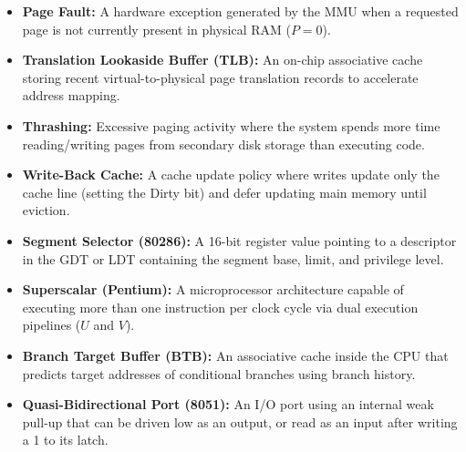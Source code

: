 \documentclass[12pt,a4paper]{article}
\begin{document}
\begin{tcolorbox}[defbox, title={One-Line Definitions}]
\begin{itemize}[leftmargin=*, itemsep=3pt]
  \item \textbf{Page Fault:} A hardware exception generated by the MMU when a requested page is not currently present in physical RAM ($P = 0$).
  \item \textbf{Translation Lookaside Buffer (TLB):} An on-chip associative cache storing recent virtual-to-physical page translation records to accelerate address mapping.
  \item \textbf{Thrashing:} Excessive paging activity where the system spends more time reading/writing pages from secondary disk storage than executing code.
  \item \textbf{Write-Back Cache:} A cache update policy where writes update only the cache line (setting the Dirty bit) and defer updating main memory until eviction.
  \item \textbf{Segment Selector (80286):} A 16-bit register value pointing to a descriptor in the GDT or LDT containing the segment base, limit, and privilege level.
  \item \textbf{Superscalar (Pentium):} A microprocessor architecture capable of executing more than one instruction per clock cycle via dual execution pipelines ($U$ and $V$).
  \item \textbf{Branch Target Buffer (BTB):} An associative cache inside the CPU that predicts target addresses of conditional branches using branch history.
  \item \textbf{Quasi-Bidirectional Port (8051):} An I/O port using an internal weak pull-up that can be driven low as an output, or read as an input after writing a 1 to its latch.
\end{itemize}
\end{tcolorbox}
\end{document}
